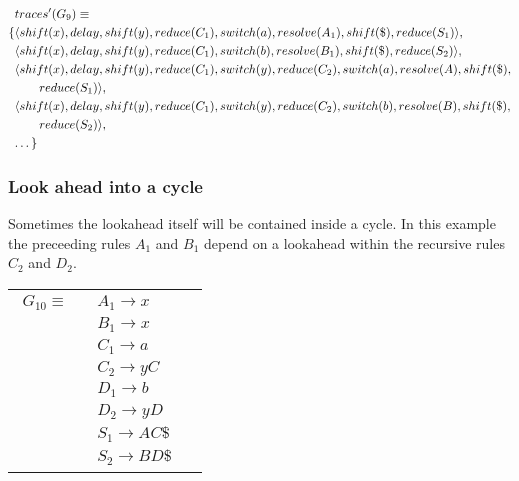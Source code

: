 \documentclass[a4paper,11pt]{article}
\begin{document}
{\small\parbox{.3\textwidth}{\begin{align*}
&traces^{\prime}(G_9) \equiv \\
\{ & \langle shift(x), delay, shift(y), reduce(C_1), switch(a), resolve(A_1), shift(\$), reduce(S_1) \rangle,\\
   & \langle shift(x), delay, shift(y), reduce(C_1), switch(b), resolve(B_1), shift(\$), reduce(S_2) \rangle,\\
   & \langle shift(x), delay, shift(y), reduce(C_1), switch(y), reduce(C_2), switch(a), resolve(A), shift(\$), \\&\qquad reduce(S_1) \rangle,\\
   & \langle shift(x), delay, shift(y), reduce(C_1), switch(y), reduce(C_2), switch(b), resolve(B), shift(\$), \\&\qquad reduce(S_2) \rangle,\\
   & \textellipsis \}
\end{align*}}}



\subsubsection{Look ahead into a cycle}
Sometimes the lookahead itself will be contained inside a cycle.
In this example the preceeding rules $A_1$ and $B_1$ depend on a lookahead within the recursive rules $C_2$ and $D_2$.

\begin{tabular}[t]{cl}
\parbox{.3\textwidth}{
\begin{align*}
G_{10} \equiv \quad & A_1 \rightarrow x\\
                  & B_1 \rightarrow x\\
                  & C_1 \rightarrow a\\
                  & C_2 \rightarrow y C\\
                  & D_1 \rightarrow b\\
                  & D_2 \rightarrow y D\\
                  & S_1 \rightarrow A C \$\\
                  & S_2 \rightarrow B D \$
\end{align*}}
\parbox{.6\textwidth}{}
\end{tabular}
\end{document}
